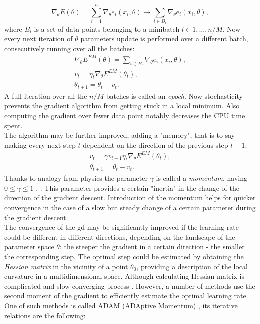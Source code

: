 \begin{equation}
\nabla_{\theta}E(\theta) = \sum^n_{i=1} \nabla_{\theta}e_i(x_i,\theta) \rightarrow \sum_{i \in B_l} \nabla_{\theta}e_i(x_i,\theta),
\end{equation}
where $B_l$ is a set of data points belonging to a minibatch $l \in 1, ... , n/M$. Now every next iteration of $\theta$ parameters update is performed over a different batch, consecutively running over all the batches: 
\begin{equation}
\begin{array}{lcl} 
\nabla_{\theta}E^{EM}(\theta) = \sum_{i \in B_l} \nabla_{\theta}e_i(x_i,\theta),\\
v_t=\eta_t\nabla_{\theta}E^{EM}(\theta_t),\\
\theta_{t+1}=\theta_t-v_t.
\end{array} 
\end{equation}
A full iteration over all the $n/M$ batches is called an \textit{epoch}. Now stochasticity prevents the gradient algorithm from getting stuck in a local minimum. Also computing the gradient over fewer data point notably decreases the CPU time spent. \\
The algorithm may be further improved, adding a "memory", that is to say making every next step $t$ dependent on the direction of the previous step $t-1$:
\begin{equation}
\begin{array}{lcl} 
v_t=\gamma v_{t-1}\eta_t\nabla_{\theta}E^{EM}(\theta_t),\\
\theta_{t+1}=\theta_t-v_t.
\end{array} 
\end{equation}
Thanks to analogy from physics the parameter $\gamma$ is called a \textit{momentum}, having $0\le\gamma \le 1$ \cite{grad_momentum1}, \cite{grad_momentum2}. This parameter provides a certain "inertia" in the change of the direction of the gradient descent. Introduction of the momentum helps for quicker convergence in the case of a slow but steady change of a certain parameter during the gradient descent.\\
The convergence of the \gls{gd} may be significantly improved if the learning rate could be different in different directions, depending on the landscape of the parameter space $\theta$: the steeper the gradient in a certain direction - the smaller the corresponding step. The optimal step could be estimated by obtaining the \textit{Hessian matrix} in the vicinity of a point $\theta_0$, providing a description of the local curvature in a multidimensional space. Although calculating Hessian matrix is complicated and slow-converging process \cite{LeCun1998}. However, a number of methods use the second moment of the gradient to efficiently estimate the optimal learning rate. One of such methods is called ADAM (ADAptive Momentum) \cite{kingma2014method}, its iterative relations are the following:
